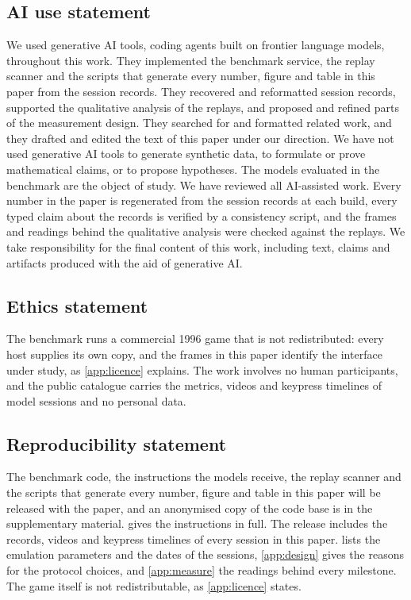 \documentclass{article} %
\begin{document}
\subsection*{AI use statement}
We used generative AI tools, coding agents built on frontier language models, throughout this work. They implemented the benchmark service, the replay scanner and the scripts that generate every number, figure and table in this paper from the session records. They recovered and reformatted session records, supported the qualitative analysis of the replays, and proposed and refined parts of the measurement design. They searched for and formatted related work, and they drafted and edited the text of this paper under our direction. We have not used generative AI tools to generate synthetic data, to formulate or prove mathematical claims, or to propose hypotheses. The models evaluated in the benchmark are the object of study. We have reviewed all AI-assisted work. Every number in the paper is regenerated from the session records at each build, every typed claim about the records is verified by a consistency script, and the frames and readings behind the qualitative analysis were checked against the replays. We take responsibility for the final content of this work, including text, claims and artifacts produced with the aid of generative AI.

\subsection*{Ethics statement}
The benchmark runs a commercial 1996 game that is not redistributed: every host supplies its own copy, and the frames in this paper identify the interface under study, as \cref{app:licence} explains. The work involves no human participants, and the public catalogue carries the metrics, videos and keypress timelines of model sessions and no personal data.

\subsection*{Reproducibility statement}
The benchmark code, the instructions the models receive, the replay scanner and the scripts that generate every number, figure and table in this paper will be released with the paper, and an anonymised copy of the code base is in the supplementary material.  gives the instructions in full. The release includes the records, videos and keypress timelines of every session in this paper.  lists the emulation parameters and the dates of the sessions, \cref{app:design} gives the reasons for the protocol choices, and \cref{app:measure} the readings behind every milestone. The game itself is not redistributable, as \cref{app:licence} states.
\end{document}
